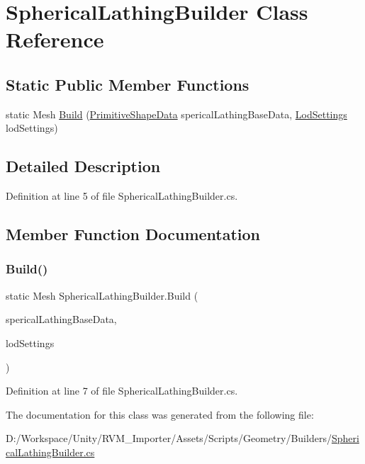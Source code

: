 \hypertarget{class_spherical_lathing_builder}{}\section{Spherical\+Lathing\+Builder Class Reference}
\label{class_spherical_lathing_builder}
\subsection*{Static Public Member Functions}
\begin{DoxyCompactItemize}
\item 
static Mesh \mbox{\hyperlink{class_spherical_lathing_builder_ad7ab4591ed11c87e514117a0633f152b}{Build}} (\mbox{\hyperlink{class_primitive_shape_data}{Primitive\+Shape\+Data}} sperical\+Lathing\+Base\+Data, \mbox{\hyperlink{class_lod_settings}{Lod\+Settings}} lod\+Settings)
\end{DoxyCompactItemize}


\subsection{Detailed Description}


Definition at line 5 of file Spherical\+Lathing\+Builder.\+cs.



\subsection{Member Function Documentation}
\mbox{\label{class_spherical_lathing_builder_ad7ab4591ed11c87e514117a0633f152b}} 
\subsubsection{\texorpdfstring{Build()}{Build()}}
{\footnotesize\ttfamily static Mesh Spherical\+Lathing\+Builder.\+Build (\begin{DoxyParamCaption}\item[{\mbox{\hyperlink{class_primitive_shape_data}{Primitive\+Shape\+Data}}}]{sperical\+Lathing\+Base\+Data,  }\item[{\mbox{\hyperlink{class_lod_settings}{Lod\+Settings}}}]{lod\+Settings }\end{DoxyParamCaption})\hspace{0.3cm}{\ttfamily [static]}}



Definition at line 7 of file Spherical\+Lathing\+Builder.\+cs.



The documentation for this class was generated from the following file\+:\begin{DoxyCompactItemize}
\item 
D\+:/\+Workspace/\+Unity/\+R\+V\+M\+\_\+\+Importer/\+Assets/\+Scripts/\+Geometry/\+Builders/\mbox{\hyperlink{_spherical_lathing_builder_8cs}{Spherical\+Lathing\+Builder.\+cs}}\end{DoxyCompactItemize}

